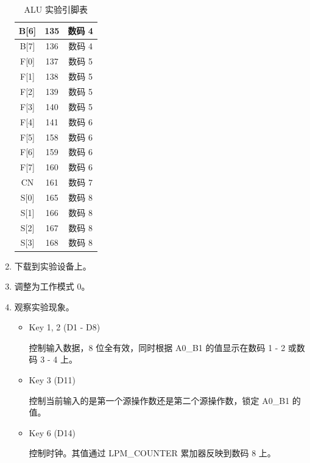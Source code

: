 \begin{enumerate}
\begin{table}[H]
\begin{tabular}{|c|c|c|}
            \hline
            B[6] & 135 & 数码 4 \\
            \hline
            B[7] & 136 & 数码 4 \\
            \hline
            F[0] & 137 & 数码 5 \\
            \hline
            F[1] & 138 & 数码 5 \\
            \hline
            F[2] & 139 & 数码 5 \\
            \hline
            F[3] & 140 & 数码 5 \\
            \hline
            F[4] & 141 & 数码 6 \\
            \hline
            F[5] & 158 & 数码 6 \\
            \hline
            F[6] & 159 & 数码 6 \\
            \hline
            F[7] & 160 & 数码 6 \\
            \hline
            CN & 161 & 数码 7 \\
            \hline
            S[0] & 165 & 数码 8 \\
            \hline
            S[1] & 166 & 数码 8 \\
            \hline
            S[2] & 167 & 数码 8 \\
            \hline
            S[3] & 168 & 数码 8 \\
            \hline
        \end{tabular}
        \caption{ALU 实验引脚表}
        \label{tab:pin3}
    \end{table}
    
    
    \item 下载到实验设备上。
    \item 调整为工作模式 0。
    \item 观察实验现象。
    
    \begin{itemize}
        \item Key 1, 2 (D1 - D8)
        
        控制输入数据，8 位全有效，同时根据 A0\_B1 的值显示在数码 1 - 2 或数码 3 - 4 上。
        
        \item Key 3 (D11)
        
        控制当前输入的是第一个源操作数还是第二个源操作数，锁定 A0\_B1 的值。
        
        \item Key 6 (D14)
        
        控制时钟。其值通过 LPM\_COUNTER 累加器反映到数码 8 上。
        

\end{itemize}
\end{enumerate}
